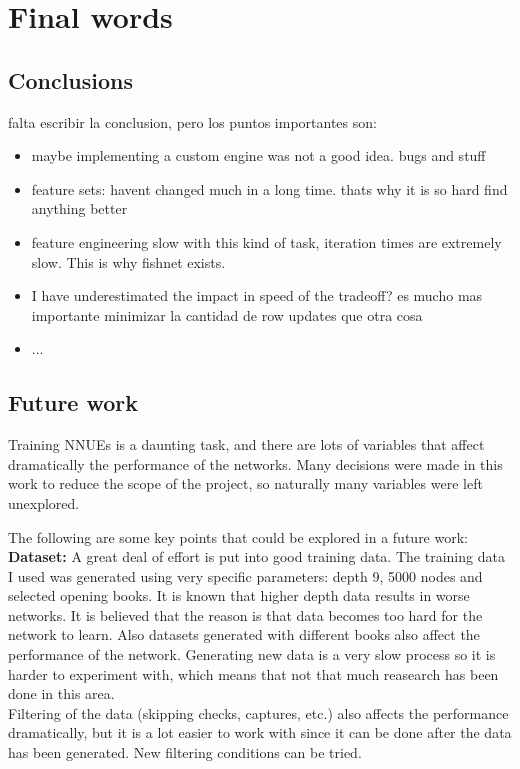 \section{Final words}
\subsection{Conclusions}

falta escribir la conclusion, pero los puntos importantes son:

\begin{itemize}
\item maybe implementing a custom engine was not a good idea. bugs and stuff
\item feature sets: havent changed much in a long time. thats why it is so hard find anything better
\item feature engineering slow with this kind of task, iteration times are extremely slow. This is why fishnet exists.
\item I have underestimated the impact in speed of the tradeoff? es mucho mas importante minimizar la cantidad de row updates que otra cosa
\item ...
\end{itemize}


\subsection{Future work}

Training NNUEs is a daunting task, and there are lots of variables that affect dramatically the performance of the networks. Many decisions were made in this work to reduce the scope of the project, so naturally many variables were left unexplored.

The following are some key points that could be explored in a future work: \\

\textbf{Dataset:} A great deal of effort is put into good training data. The training data I used was generated using very specific parameters: depth 9, 5000 nodes and selected opening books. It is known that higher depth data results in worse networks. It is believed that the reason is that data becomes too hard for the network to learn. Also datasets generated with different books also affect the performance of the network.  Generating new data is a very slow process so it is harder to experiment with, which means that not that much reasearch has been done in this area. \\
Filtering of the data (skipping checks, captures, etc.) also affects the performance dramatically, but it is a lot easier to work with since it can be done after the data has been generated. New filtering conditions can be tried. \\

